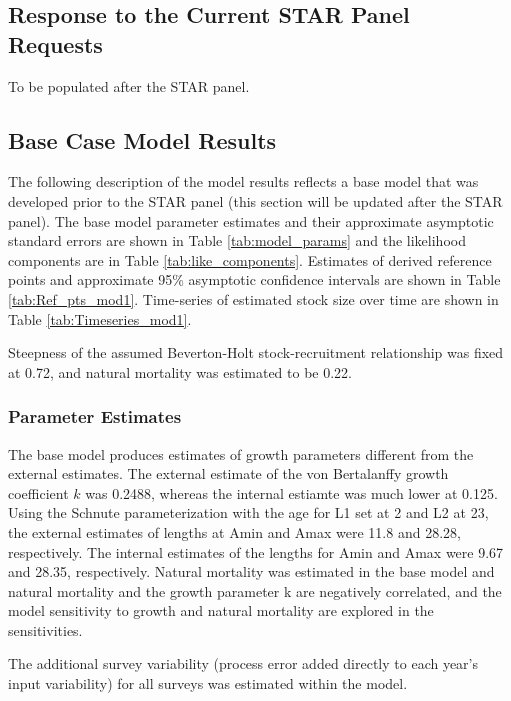 \documentclass[12pt,]{article}
\begin{document}
\subsection{Response to the Current STAR Panel
Requests}\label{response-to-the-current-star-panel-requests}

To be populated after the STAR panel.

\subsection{Base Case Model Results}\label{base-case-model-results}

The following description of the model results reflects a base model
that was developed prior to the STAR panel (this section will be updated
after the STAR panel). The base model parameter estimates and their
approximate asymptotic standard errors are shown in Table
\ref{tab:model_params} and the likelihood components are in Table
\ref{tab:like_components}. Estimates of derived reference points and
approximate 95\% asymptotic confidence intervals are shown in Table
\ref{tab:Ref_pts_mod1}. Time-series of estimated stock size over time
are shown in Table \ref{tab:Timeseries_mod1}.

Steepness of the assumed Beverton-Holt stock-recruitment relationship
was fixed at 0.72, and natural mortality was estimated to be 0.22.

\subsubsection{Parameter Estimates}\label{parameter-estimates}

The base model produces estimates of growth parameters different from
the external estimates. The external estimate of the von Bertalanffy
growth coefficient \(k\) was 0.2488, whereas the internal estiamte was
much lower at 0.125. Using the Schnute parameterization with the age for
L1 set at 2 and L2 at 23, the external estimates of lengths at Amin and
Amax were 11.8 and 28.28, respectively. The internal estimates of the
lengths for Amin and Amax were 9.67 and 28.35, respectively. Natural
mortality was estimated in the base model and natural mortality and the
growth parameter k are negatively correlated, and the model sensitivity
to growth and natural mortality are explored in the sensitivities.

The additional survey variability (process error added directly to each
year's input variability) for all surveys was estimated within the
model.
\end{document}
